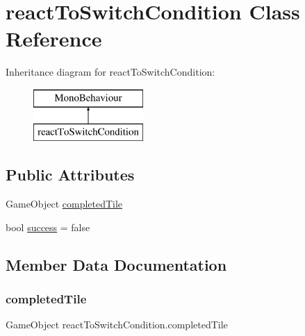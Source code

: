 \hypertarget{classreact_to_switch_condition}{}\section{react\+To\+Switch\+Condition Class Reference}
\label{classreact_to_switch_condition}
Inheritance diagram for react\+To\+Switch\+Condition\+:\begin{figure}[H]
\begin{center}
\leavevmode
\includegraphics[height=2.000000cm]{classreact_to_switch_condition}
\end{center}
\end{figure}
\subsection*{Public Attributes}
\begin{DoxyCompactItemize}
\item 
Game\+Object \hyperlink{classreact_to_switch_condition_a99169203efd4bfe68fb3d6e1eb63b902}{completed\+Tile}
\item 
bool \hyperlink{classreact_to_switch_condition_a121e56c060bf68e9f53f776632ac310a}{success} = false
\end{DoxyCompactItemize}


\subsection{Member Data Documentation}
\mbox{\label{classreact_to_switch_condition_a99169203efd4bfe68fb3d6e1eb63b902}} 
\subsubsection{\texorpdfstring{completed\+Tile}{completedTile}}
{\footnotesize\ttfamily Game\+Object react\+To\+Switch\+Condition.\+completed\+Tile}

\mbox{\label{classreact_to_switch_condition_a121e56c060bf68e9f53f776632ac310a}} 
